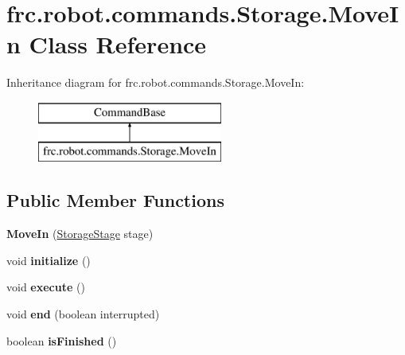 \hypertarget{classfrc_1_1robot_1_1commands_1_1_storage_1_1_move_in}{}\section{frc.\+robot.\+commands.\+Storage.\+Move\+In Class Reference}
\label{classfrc_1_1robot_1_1commands_1_1_storage_1_1_move_in}
Inheritance diagram for frc.\+robot.\+commands.\+Storage.\+Move\+In\+:\begin{figure}[H]
\begin{center}
\leavevmode
\includegraphics[height=2.000000cm]{classfrc_1_1robot_1_1commands_1_1_storage_1_1_move_in}
\end{center}
\end{figure}
\subsection*{Public Member Functions}
\begin{DoxyCompactItemize}
\item 
\mbox{\label{classfrc_1_1robot_1_1commands_1_1_storage_1_1_move_in_a841271436ffdd1639ef461ed6ad5ab12}} 
{\bfseries Move\+In} (\mbox{\hyperlink{enumfrc_1_1robot_1_1enums_1_1_storage_stage}{Storage\+Stage}} stage)
\item 
\mbox{\label{classfrc_1_1robot_1_1commands_1_1_storage_1_1_move_in_af42a9da3750e1eb0dad793a4105c3350}} 
void {\bfseries initialize} ()
\item 
\mbox{\label{classfrc_1_1robot_1_1commands_1_1_storage_1_1_move_in_a7317ce70a3f119fe4d0f53688186a9f0}} 
void {\bfseries execute} ()
\item 
\mbox{\label{classfrc_1_1robot_1_1commands_1_1_storage_1_1_move_in_a023bf438beb450bfaf5d65b61394db90}} 
void {\bfseries end} (boolean interrupted)
\item 
\mbox{\label{classfrc_1_1robot_1_1commands_1_1_storage_1_1_move_in_a8c57ce2024e76e5b150e61a9aaf5aa87}} 
boolean {\bfseries is\+Finished} ()
\end{DoxyCompactItemize}
